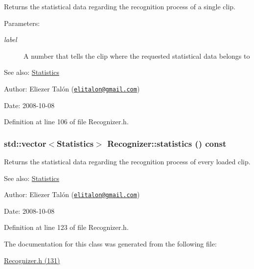 Returns the statistical data regarding the recognition process of a single clip. 

\begin{Desc}
\item[Parameters:]
\begin{description}
\item[{\em label}]A number that tells the clip where the requested statistical data belongs to\end{description}
\end{Desc}
\begin{Desc}
\item[See also:]\hyperlink{class_statistics}{Statistics}\end{Desc}
\begin{Desc}
\item[Author:]Eliezer Talón (\href{mailto:elitalon@gmail.com}{\tt elitalon@gmail.com}) \end{Desc}
\begin{Desc}
\item[Date:]2008-10-08 \end{Desc}


Definition at line 106 of file Recognizer.h.\hypertarget{class_recognizer_82b28c720acc5fcc26059a6b4ba93c1a}{
\subsubsection[statistics]{\setlength{\rightskip}{0pt plus 5cm}std::vector$<${\bf Statistics}$>$ Recognizer::statistics () const}}
\label{class_recognizer_82b28c720acc5fcc26059a6b4ba93c1a}


Returns the statistical data regarding the recognition process of every loaded clip. 

\begin{Desc}
\item[See also:]\hyperlink{class_statistics}{Statistics}\end{Desc}
\begin{Desc}
\item[Author:]Eliezer Talón (\href{mailto:elitalon@gmail.com}{\tt elitalon@gmail.com}) \end{Desc}
\begin{Desc}
\item[Date:]2008-10-08 \end{Desc}


Definition at line 123 of file Recognizer.h.

The documentation for this class was generated from the following file:\begin{CompactItemize}
\item 
\hyperlink{_recognizer_8h}{Recognizer.h (131)}\end{CompactItemize}
